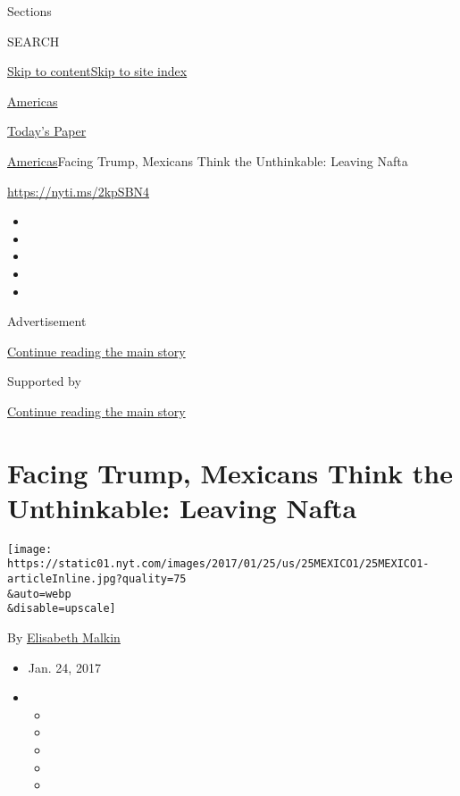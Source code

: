 Sections

SEARCH

\protect\hyperlink{site-content}{Skip to
content}\protect\hyperlink{site-index}{Skip to site index}

\href{https://www.nytimes.com/section/world/americas}{Americas}

\href{https://myaccount.nytimes.com/auth/login?response_type=cookie\&client_id=vi}{}

\href{https://www.nytimes.com/section/todayspaper}{Today's Paper}

\href{/section/world/americas}{Americas}\textbar{}Facing Trump, Mexicans
Think the Unthinkable: Leaving Nafta

\url{https://nyti.ms/2kpSBN4}

\begin{itemize}
\item
\item
\item
\item
\item
\end{itemize}

Advertisement

\protect\hyperlink{after-top}{Continue reading the main story}

Supported by

\protect\hyperlink{after-sponsor}{Continue reading the main story}

\hypertarget{facing-trump-mexicans-think-the-unthinkable-leaving-nafta}{%
\section{Facing Trump, Mexicans Think the Unthinkable: Leaving
Nafta}\label{facing-trump-mexicans-think-the-unthinkable-leaving-nafta}}

\texttt{[image: https://static01.nyt.com/images/2017/01/25/us/25MEXICO1/25MEXICO1-articleInline.jpg?quality=75\\\&auto=webp\\\&disable=upscale]}

By \href{https://www.nytimes.com/by/elisabeth-malkin}{Elisabeth Malkin}

\begin{itemize}
\item
  Jan. 24, 2017
\item
  \begin{itemize}
  \item
  \item
  \item
  \item
  \item
  \end{itemize}
\end{itemize}

